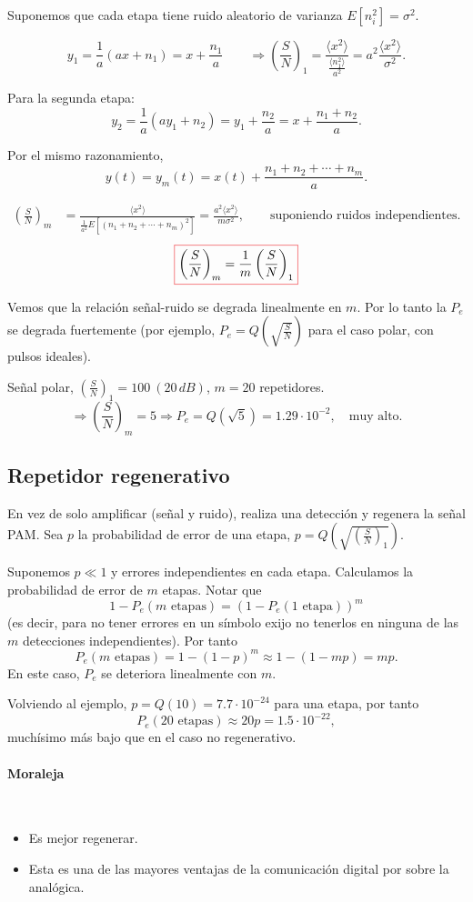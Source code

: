Suponemos que cada etapa tiene ruido aleatorio de varianza
$E[n_i^2] = \sigma^2$.

\[y_1 = \frac{1}{a}(a x + n_1) = x+ \frac{n_1}{a} \qquad \Longrightarrow \left(\frac{S}{N}\right)_1 =
\frac{\langle x^2 \rangle}{\frac{\langle n_1^2\rangle}{a^2}} = a^2
\frac{\langle x^2\rangle}{\sigma^2}.\]

Para la segunda etapa:
\[y_2 = \frac{1}{a}(a y_1 +n_2) = y_1 + \frac{n_2}{a} = x + \frac{n_1+n_2}{a}.\]

Por el mismo razonamiento,
\[y(t) = y_m(t) = x(t) + \frac{n_1+n_2+\cdots+n_m}{a}.\]

\begin{align*}
 \left(\frac{S}{N}\right)_m & = \frac{\langle x^2 \rangle}{\frac{1}{a^2} E\left[(n_1+n_2+\cdots+n_m)^2\right]} =
  \frac{a^2 \langle x^2\rangle}{m \sigma^2}, \qquad \text{suponiendo ruidos independientes.}
\end{align*}
\[{\col{ \left(\frac{S}{N}\right)_m = \frac{1}{m}
\left(\frac{S}{N}\right)_1}}\]

 Vemos que la relación señal-ruido se degrada linealmente en $m$. Por lo tanto
la $P_e$ se degrada fuertemente (por ejemplo,
$P_e=Q\left(\sqrt{\frac{S}{N}}\right)$ para el caso polar, con
pulsos ideales).

\begin{ejemplo}[numérico] Señal polar, $\left(\frac{S}{N}\right)_1 = 100 \  (20\,dB)$, $m=20$
repetidores.
  \[ \Rightarrow \left(\frac{S}{N}\right)_m = 5 \Rightarrow P_e  = Q(\sqrt{5}) = 1.29\cdot 10^{-2}, \quad\text{muy alto.}\]
 \end{ejemplo}

\subsection*{Repetidor regenerativo}

En vez de solo amplificar (señal y ruido), realiza una detección y
regenera la señal PAM. Sea $p$ la probabilidad de error de una
etapa, $p=Q\left(\sqrt{\left(\frac{S}{N}\right)_1}\right)$.

Suponemos $p\ll 1$ y errores independientes en cada etapa.
Calculamos la probabilidad de error de $m$ etapas. Notar que
\[1 - P_e(m\text{ etapas})  = (1-P_e(1 \text{ etapa}))^m \]
(es decir, para no tener errores en un símbolo exijo no tenerlos
en ninguna de las $m$ detecciones independientes). Por tanto
\[P_e(m\text{ etapas}) = 1 -(1-p)^m  \approx 1-(1-mp) = mp.\]
En este caso, $P_e$ se deteriora linealmente con $m$.

Volviendo al ejemplo, $p=Q(10) = 7.7\cdot 10^{-24}$ para una
etapa, por tanto
\[ P_e (20 \text{ etapas}) \approx 20 p = 1.5\cdot 10^{-22},\]
muchísimo más bajo que en el caso no regenerativo.

\paragraph{Moraleja}$\phantom{1}$
\begin{itemize}
 \item Es mejor regenerar.
 \item Esta es una de las mayores ventajas de la comunicación digital por sobre la analógica.
\end{itemize}
